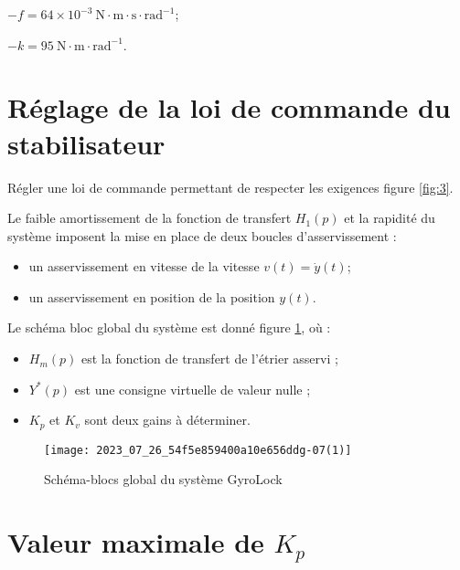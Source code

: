 $-f=64 \times 10^{-3} \mathrm{~N} \cdot \mathrm{m} \cdot \mathrm{s} \cdot \mathrm{rad}^{-1}$;

$-k=95 \mathrm{~N} \cdot \mathrm{m} \cdot \mathrm{rad}^{-1}$.


\section{Réglage de la loi de commande du stabilisateur}
\begin{obj}
Régler une loi de commande permettant de respecter les exigences figure \ref{fig:3}.
\end{obj}

Le faible amortissement de la fonction de transfert $H_{1}(p)$ et la rapidité du système imposent la mise en place de deux boucles d'asservissement :
\begin{itemize}
 \item  un asservissement en vitesse de la vitesse $v(t)=\dot{y}(t)$;
  \item un asservissement en position de la position $y(t)$.
\end{itemize}

Le schéma bloc global du système est donné figure \ref{fig:11}, où :

\begin{itemize}
  \item $H_{m}(p)$ est la fonction de transfert de l'étrier asservi ;

  \item $Y^{*}(p)$ est une consigne virtuelle de valeur nulle ;

  \item $K_{p}$ et $K_{v}$ sont deux gains à déterminer.

\end{itemize}


\begin{figure}[!h]
\centering
\texttt{[image: 2023\_07\_26\_54f5e859400a10e656ddg-07(1)]}
\caption{\label{fig:11}Schéma-blocs global du système GyroLock}
\end{figure}

\section{\label{sec:III.A} Valeur maximale de $K_{p}$}


